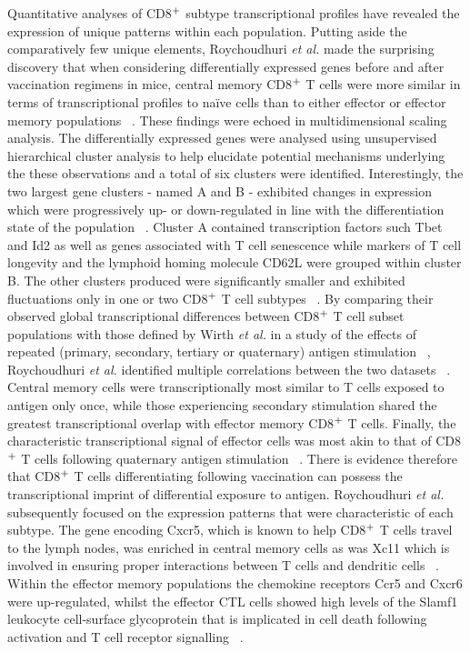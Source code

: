 Quantitative analyses of CD8$\textsuperscript{+}$ subtype transcriptional profiles have revealed the expression of unique patterns within each population. Putting aside the comparatively few unique elements, Roychoudhuri \textit{et al.} made the surprising discovery that when considering differentially expressed genes before and after vaccination regimens in mice, central memory CD8$\textsuperscript{+}$ T cells were more similar in terms of transcriptional profiles to na\"ive cells than to either effector or effector memory populations ~\autocite{Roy2015}. These findings were echoed in multidimensional scaling analysis. The differentially expressed genes were analysed using unsupervised hierarchical cluster analysis to help elucidate potential mechanisms underlying the these observations and a total of six clusters were identified. Interestingly, the two largest gene clusters - named A and B - exhibited changes in expression which were progressively up- or down-regulated in line with the differentiation state of the population ~\autocite{Roy2015}. Cluster A contained transcription factors such Tbet and Id2 as well as genes associated with T cell senescence while markers of T cell longevity and the lymphoid homing molecule CD62L were grouped within cluster B. The other clusters produced were significantly smaller and exhibited fluctuations only in one or two CD8$\textsuperscript{+}$ T cell subtypes ~\autocite{Roy2015}. By comparing their observed global transcriptional differences between CD8$\textsuperscript{+}$ T cell subset populations with those defined by Wirth \textit{et al.} in a study of the effects of repeated (primary, secondary, tertiary or quaternary) antigen stimulation ~\autocite{Wir2010}, Roychoudhuri \textit{et al.} identified multiple correlations between the two datasets ~\autocite{Roy2015}. Central memory cells were transcriptionally most similar to T cells exposed to antigen only once, while those experiencing secondary stimulation shared the greatest transcriptional overlap with effector memory CD8$\textsuperscript{+}$ T cells. Finally, the characteristic transcriptional signal of effector cells was most akin to that of CD8$\textsuperscript{+}$ T cells following quaternary antigen stimulation ~\autocite{Roy2015}. There is evidence therefore that CD8$\textsuperscript{+}$ T cells differentiating following vaccination can possess the transcriptional imprint of differential exposure to antigen. Roychoudhuri \textit{et al.} subsequently focused on the expression patterns that were characteristic of each subtype. The gene encoding Cxcr5, which is known to help CD8$\textsuperscript{+}$ T cells travel to the lymph nodes, was enriched in central memory cells as was Xc11 which is involved in ensuring proper interactions between T cells and dendritic cells ~\autocite{Roy2015}. Within the effector memory populations the chemokine receptors Ccr5 and Cxcr6 were up-regulated, whilst the effector CTL cells showed high levels of the Slamf1 leukocyte cell-surface glycoprotein that is implicated in cell death following activation and T cell receptor signalling ~\autocite{Roy2015}. 

